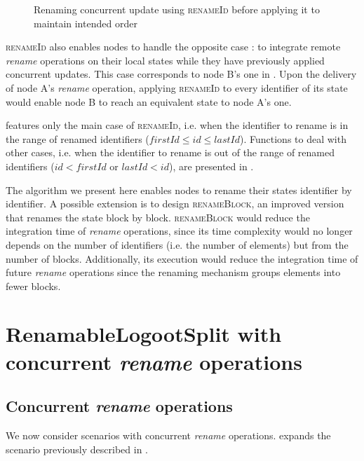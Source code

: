 \documentclass[10pt,journal,compsoc]{IEEEtran}
\let\MYoriglatexcaption\caption
\renewcommand{\caption}[2][\relax]{\MYoriglatexcaption[#2]{#2}}
\newcommand{\ie}{i.e. }
\newcommand{\trm}[1]{\mathit{#1}}
\begin{document}
\begin{figure}[!ht]
\begin{tikzpicture}
    \end{tikzpicture}
    \caption{Renaming concurrent update using \textsc{renameId} before applying it to maintain intended order}
    \label{fig:concurrent-insert-rename-fixed}
\end{figure}

\textsc{renameId} also enables nodes to handle the opposite case : to integrate remote \emph{rename} operations on their local states while they have previously applied concurrent updates.
This case corresponds to node B's one in .
Upon the delivery of node A's \emph{rename} operation, applying \textsc{renameId} to every identifier of its state would enable node B to reach an equivalent state to node A's one.

 features only the main case of \textsc{renameId}, \ie when the identifier to rename is in the range of renamed identifiers ($\trm{firstId} \leq \trm{id} \leq \trm{lastId}$).
Functions to deal with other cases, \ie when the identifier to rename is out of the range of renamed identifiers ($\trm{id} < \trm{firstId}$ or $\trm{lastId} < \trm{id}$), are presented in .

The algorithm we present here enables nodes to rename their states identifier by identifier.
A possible extension is to design \textsc{renameBlock}, an improved version that renames the state block by block.
\textsc{renameBlock} would reduce the integration time of \emph{rename} operations, since its time complexity would no longer depends on the number of identifiers (\ie the number of elements) but from the number of blocks.
Additionally, its execution would reduce the integration time of future \emph{rename} operations since the renaming mechanism groups elements into fewer blocks.

\section{RenamableLogootSplit with concurrent \emph{rename} operations}

\label{sec:distributed-rls}

\subsection{Concurrent \emph{rename} operations}

We now consider scenarios with concurrent \emph{rename} operations.
 expands the scenario previously described in .
\end{document}
